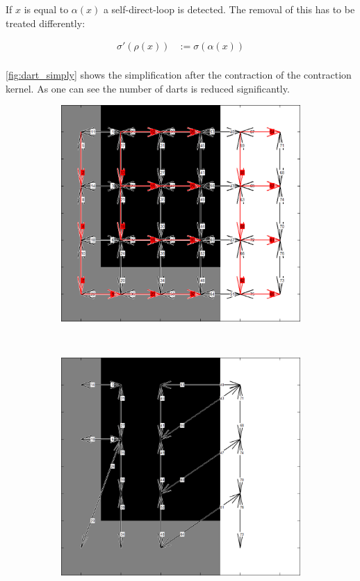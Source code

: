 \documentclass[12pt]{article}
\begin{document}
If \( x \) is equal to \( \alpha(x) \) a self-direct-loop is detected. The removal of this has to be treated differently:

\begin{align}
  \sigma'(\rho(x))  &:= \sigma(\alpha(x)) \\
\end{align}

\cref{fig:dart_simply} shows the simplification after the contraction of the contraction kernel. As one can see the number of darts is reduced significantly.

\begin{figure}[tb]
  \centering

    \begin{subfigure}[b]{0.3\textwidth}
      \includegraphics[width=\textwidth]{img/simply2.jpg}
      \caption{}\label{fig:dart_simply2}
    \end{subfigure}
    ~
    \begin{subfigure}[b]{0.3\textwidth}
      \includegraphics[width=\textwidth]{img/simply3.jpg}

\end{subfigure}
\end{figure}
\end{document}
